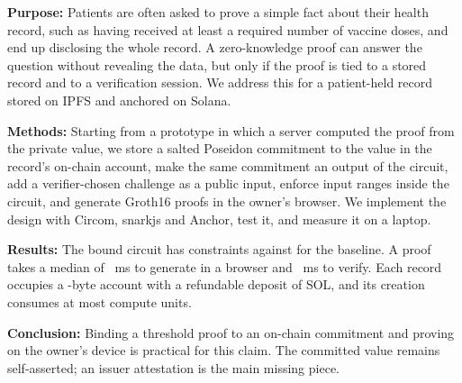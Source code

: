 \textbf{Purpose:} Patients are often asked to prove a simple fact about
their health record, such as having received at least a required number of
vaccine doses, and end up disclosing the whole record. A zero-knowledge
proof can answer the question without revealing the data, but only if the
proof is tied to a stored record and to a verification session. We address
this for a patient-held record stored on IPFS and anchored on Solana.

\textbf{Methods:} Starting from a prototype in which a server computed the
proof from the private value, we store a salted Poseidon commitment to the
value in the record's on-chain account, make the same commitment an output
of the circuit, add a verifier-chosen challenge as a public input, enforce
input ranges inside the circuit, and generate Groth16 proofs in the owner's
browser. We implement the design with Circom, snarkjs and Anchor, test it,
and measure it on a laptop.

\textbf{Results:} The bound circuit has \NewConstraints{} constraints
against \OldConstraints{} for the baseline. A proof takes a median of
\BrowserProveMs~ms to generate in a browser and \NewVerifyMs~ms to verify.
Each record occupies a \AccountBytes-byte account with a refundable deposit
of \RentSol{} SOL, and its creation consumes at most \CuMax{} compute units.

\textbf{Conclusion:} Binding a threshold proof to an on-chain commitment and
proving on the owner's device is practical for this claim. The committed
value remains self-asserted; an issuer attestation is the main missing
piece.
